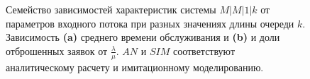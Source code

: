 \documentclass[a4paper,12 pt]{article}
\begin{document}
\begin{figure}[H]%
	\begin{subfigure}{\textwidth}
		\caption{}
	\end{subfigure}
	\hspace{\fill}%
	\begin{subfigure}{\textwidth}
		\caption{}
	\end{subfigure}
	\caption{Семейство зависимостей характеристик системы $M|M|1|k $ от параметров входного потока при разных значениях длины очереди $k$. Зависимость \textbf{(a)} среднего времени обслуживания и \textbf{(b)} и доли отброшенных заявок от $\frac{\lambda}{\mu}$. $AN$ и $SIM$ соответствуют аналитическому расчету и имитационному моделированию.}
	\label{fig:mm1k}
\end{figure}
\end{document}
